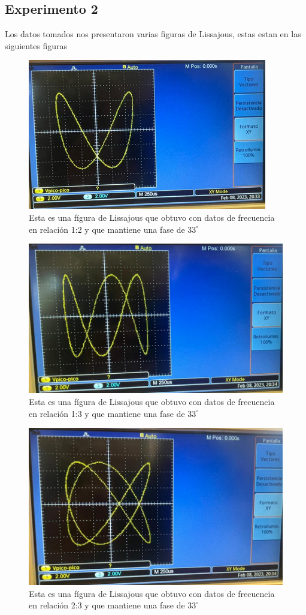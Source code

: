 \documentclass[a4paper, amsfonts, amssymb, amsmath, reprint, showkeys, nofootinbib, twoside]{revtex4-1}
\begin{document}
\subsection{Experimento 2}
Los datos tomados nos presentaron varias figuras de Lissajous, estas estan en las siguientes figuras
\begin{figure}[H]
    \centering
    \includegraphics[scale=0.4]{Exp2_Img1.jpeg}
    \caption{Esta es una fígura de Lissajous que obtuvo con datos de frecuencia en relación 1:2 y que mantiene una fase de $33^\circ$}
    \label{fig:1_2}
\end{figure}
\begin{figure}[H]
    \centering
    \includegraphics[scale=0.4]{Exp2_Img2.jpeg}
    \caption{Esta es una fígura de Lissajous que obtuvo con datos de frecuencia en relación 1:3 y que mantiene una fase de $33^\circ$}
    \label{fig:1_3}
\end{figure}
\begin{figure}[H]
    \centering
    \includegraphics[scale=0.4]{Exp2_Img3.jpeg}
    \caption{Esta es una fígura de Lissajous que obtuvo con datos de frecuencia en relación 2:3 y que mantiene una fase de $33^\circ$}
    \label{fig:2_3}
\end{figure}
\end{document}
